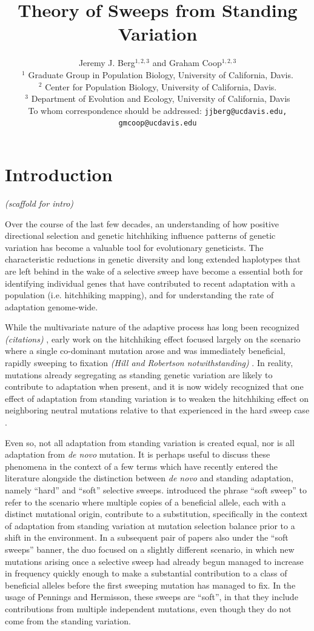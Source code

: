 \documentclass[a4paper,10pt]{article}
\title{Theory of Sweeps from Standing Variation}
\author{
Jeremy J. Berg$^{1,2,3}$ and Graham Coop$^{1,2,3}$ \\
$^1$ Graduate Group in Population Biology, University of California, Davis. \\
$^2$ Center for Population Biology, University of California, Davis.\\
$^3$ Department of Evolution and Ecology, University of California, Davis\\
\small To whom correspondence should be addressed: \texttt{jjberg@ucdavis.edu, gmcoop@ucdavis.edu}\\
}
\date{}
\newcommand{\jb}[1]{{\it\color{blue} (#1)} }
\begin{document}
\maketitle

\begin{abstract}
\end{abstract}

\section{Introduction}
\jb{scaffold for intro}

Over the course of the last few decades, an understanding of how positive directional selection and genetic hitchhiking influence patterns of genetic variation has become a valuable tool for evolutionary geneticists. The characteristic reductions in genetic diversity and long extended haplotypes that are left behind in the wake of a selective sweep have become a essential both for identifying individual genes that have contributed to recent adaptation with a population (i.e. hitchhiking mapping), and for understanding the rate of adaptation genome-wide.

While the multivariate nature of the adaptive process has long been recognized \jb{citations}, early work on the hitchhiking effect focused largely on the scenario where a single co-dominant mutation arose and was immediately beneficial, rapidly sweeping to fixation \jb{Hill and Robertson notwithstanding}. In reality, mutations already segregating as standing genetic variation are likely to contribute to adaptation when present, and it is now widely recognized that one effect of adaptation from standing variation is to weaken the hitchhiking effect on neighboring neutral mutations relative to that experienced in the hard sweep case \citep{Orr2001a,Innan:2004bk,Hermisson2005,Przeworski2005,Pennings2006,BARRETT:2008cs}.

Even so, not all adaptation from standing variation is created equal, nor is all adaptation from \textit{de novo} mutation. It is perhaps useful to discuss these phenomena in the context of a few terms which have recently entered the literature alongside the distinction between \textit{de novo} and standing adaptation, namely ``hard'' and ``soft'' selective sweeps. \cite{Hermisson2005} introduced the phrase ``soft sweep'' to refer to the scenario where multiple copies of a beneficial allele, each with a distinct mutational origin, contribute to a substitution, specifically in the context of adaptation from standing variation at mutation selection balance prior to a shift in the environment. In a subsequent pair of papers also under the ``soft sweeps'' banner, the duo focused on a slightly different scenario, in which new mutations arising once a selective sweep had already begun managed to increase in frequency quickly enough to make a substantial contribution to a class of beneficial alleles before the first sweeping mutation has managed to fix. In the usage of Pennings and Hermisson, these sweeps are ``soft'', in that they include contributions from multiple independent mutations, even though they do not come from the standing variation.
\end{document}

